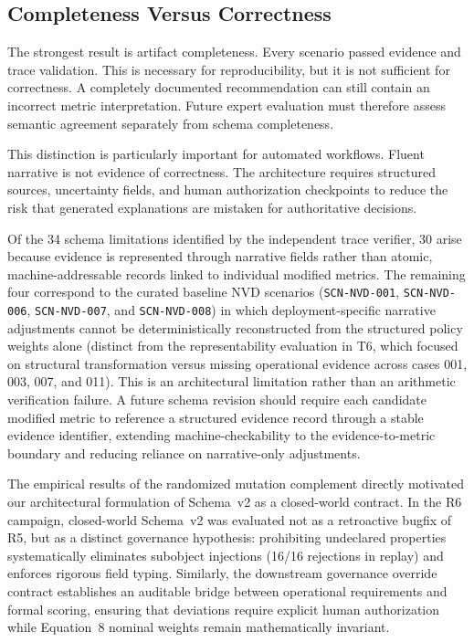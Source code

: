 \documentclass[conference]{IEEEtran}
\begin{document}
\subsection{Completeness Versus Correctness}

The strongest result is artifact completeness. Every scenario passed evidence
and trace validation. This is necessary for reproducibility, but it is not
sufficient for correctness. A completely documented recommendation can still
contain an incorrect metric interpretation. Future expert evaluation must
therefore assess semantic agreement separately from schema completeness.

This distinction is particularly important for automated workflows.
Fluent narrative is not evidence of correctness. The architecture requires
structured sources, uncertainty fields, and human authorization checkpoints to reduce the risk
that generated explanations are mistaken for authoritative decisions.

Of the 34 schema limitations identified by the independent trace verifier, 30 arise because evidence is represented through narrative fields rather than atomic, machine-addressable records linked to individual modified metrics. The remaining four correspond to the curated baseline NVD scenarios (\texttt{SCN-NVD-001}, \texttt{SCN-NVD-006}, \texttt{SCN-NVD-007}, and \texttt{SCN-NVD-008}) in which deployment-specific narrative adjustments cannot be deterministically reconstructed from the structured policy weights alone (distinct from the representability evaluation in T6, which focused on structural transformation versus missing operational evidence across cases 001, 003, 007, and 011). This is an architectural limitation rather than an arithmetic verification failure. A future schema revision should require each candidate modified metric to reference a structured evidence record through a stable evidence identifier, extending machine-checkability to the evidence-to-metric boundary and reducing reliance on narrative-only adjustments.

The empirical results of the randomized mutation complement directly motivated our architectural formulation of Schema~v2 as a closed-world contract. In the R6 campaign, closed-world Schema~v2 was evaluated not as a retroactive bugfix of R5, but as a distinct governance hypothesis: prohibiting undeclared properties systematically eliminates subobject injections (16/16 rejections in replay) and enforces rigorous field typing. Similarly, the downstream governance override contract establishes an auditable bridge between operational requirements and formal scoring, ensuring that deviations require explicit human authorization while Equation~8 nominal weights remain mathematically invariant.
\end{document}
